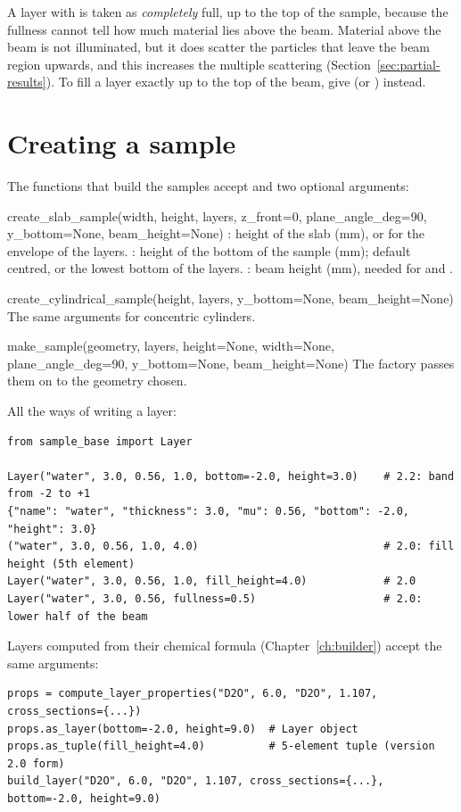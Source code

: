 \begin{warn}
A layer with  is taken as \emph{completely} full, up to the top of the sample, because the fullness
cannot tell how much material lies above the beam. Material above the beam is not illuminated, but it does scatter the
particles that leave the beam region upwards, and this increases the multiple scattering (Section~\ref{sec:partial-results}).
To fill a layer exactly up to the top of the beam, give  (or ) instead.
\end{warn}

\section{Creating a sample}

The functions that build the samples accept  and two optional arguments:

\begin{fnbox}{create\_slab\_sample(width, height, layers, z\_front=0, plane\_angle\_deg=90, y\_bottom=None, beam\_height=None)}
: height of the slab (mm), or  for the envelope of the layers.
: height of the bottom of the sample (mm); default centred, or the lowest bottom of the layers.
: beam height (mm), needed for  and .
\end{fnbox}
\begin{fnbox}{create\_cylindrical\_sample(height, layers, y\_bottom=None, beam\_height=None)}
The same arguments for concentric cylinders.
\end{fnbox}
\begin{fnbox}{make\_sample(geometry, layers, height=None, width=None, plane\_angle\_deg=90, y\_bottom=None, beam\_height=None)}
The factory passes them on to the geometry chosen.
\end{fnbox}

All the ways of writing a layer:
\begin{lstlisting}
from sample_base import Layer

Layer("water", 3.0, 0.56, 1.0, bottom=-2.0, height=3.0)    # 2.2: band from -2 to +1
{"name": "water", "thickness": 3.0, "mu": 0.56, "bottom": -2.0, "height": 3.0}
("water", 3.0, 0.56, 1.0, 4.0)                             # 2.0: fill height (5th element)
Layer("water", 3.0, 0.56, 1.0, fill_height=4.0)            # 2.0
Layer("water", 3.0, 0.56, fullness=0.5)                    # 2.0: lower half of the beam
\end{lstlisting}
Layers computed from their chemical formula (Chapter~\ref{ch:builder}) accept the same arguments:
\begin{lstlisting}
props = compute_layer_properties("D2O", 6.0, "D2O", 1.107, cross_sections={...})
props.as_layer(bottom=-2.0, height=9.0)  # Layer object
props.as_tuple(fill_height=4.0)          # 5-element tuple (version 2.0 form)
build_layer("D2O", 6.0, "D2O", 1.107, cross_sections={...}, bottom=-2.0, height=9.0)
\end{lstlisting}

